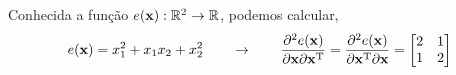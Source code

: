 \begin{example}
Conhecida a função $e(\VECTOR{x}): \mathbb{R}^2 \rightarrow \mathbb{R}$, podemos calcular,
\begin{equation}
e(\VECTOR{x})=x_1^2+x_1 x_2+x_2^2
\qquad \rightarrow \qquad
\frac{\partial^2 e(\VECTOR{x}) }{\partial \VECTOR{x} \partial \VECTOR{x}^{\transpose}}=
\frac{\partial^2 e(\VECTOR{x}) }{\partial \VECTOR{x}^{\transpose} \partial \VECTOR{x}}=
\begin{bmatrix}
 2 & 1 \\
 1 & 2
\end{bmatrix}
\end{equation}
\end{example}

